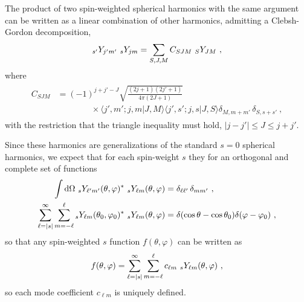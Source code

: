 The product of two spin-weighted spherical harmonics with the same argument can be written as a linear combination of other harmonics, admitting a Clebsh-Gordon decomposition,
\begin{align}
	\uu[s']{Y}{j' m'} ~\uu[s]{Y}{j m} = \sum_{S,J,M} C_{SJM} ~\uu[S]{Y}{JM} ~,
\end{align}
where
\begin{align}
	\begin{split}
		C_{SJM} &= (-1)^{j+j'-J} \sqrt{\frac{(2j+1)(2j'+1)}{4\pi(2J+1)}} \\
		&\qquad\qquad \times \langle j',m' ; j, m | J,M \rangle\langle j',s' ; j, s | J, S \rangle \delta_{M,m+m'}\,\delta_{S,s+s'} ~,
	\end{split}
\end{align}
with the restriction that the triangle inequality must hold, $|j - j'|\le J \le j+j'$. 

Since these harmonics are generalizations of the standard $s=0$ spherical harmonics, we expect that for each spin-weight $s$ they for an orthogonal and complete set of functions
\begin{align}
	\begin{split}
		\int \dd \Omega ~\uu[s]{Y}{\ell' m'}(\theta,\varphi)^* ~\uu[s]{Y}{\ell m}(\theta,\varphi) &= \delta_{\ell\ell'} \,\delta_{mm'} ~,\\
		\sum_{\ell=|s|}^\infty \sum_{m=-\ell}^\ell \uu[s]{Y}{\ell m}(\theta_0,\varphi_0)^* ~\uu[s]{Y}{\ell m}(\theta,\varphi) &= \delta(\cos\theta - \cos\theta_0) \delta(\varphi - \varphi_0) ~,
	\end{split}
\end{align}
so that any spin-weighted $s$ function $f(\theta,\varphi)$ can be written as
\begin{align}
	\begin{split}
		f(\theta,\varphi) = \sum_{\ell=|s|}^\infty \sum_{m=-\ell}^\ell c_{\ell m} ~\uu[s]{Y}{\ell m}(\theta,\varphi) ~,
	\end{split}
\end{align}
so each mode coefficient $c_{\ell m}$ is uniquely defined.